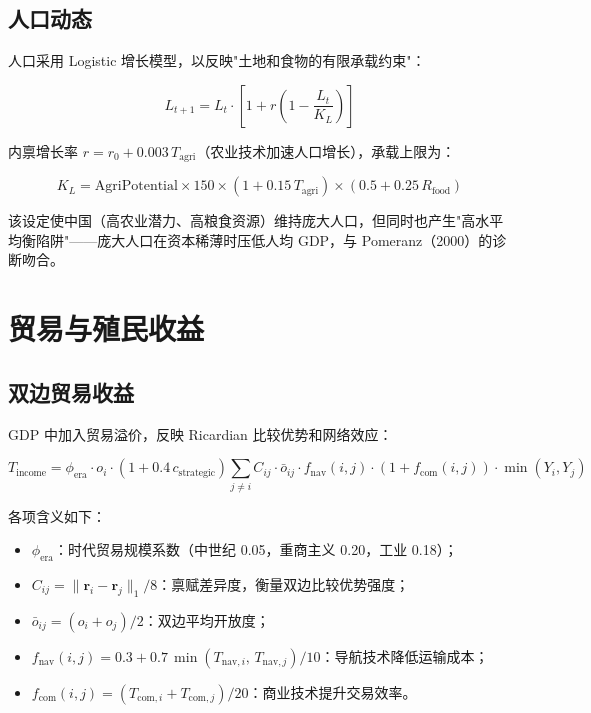 \documentclass[12pt, a4paper]{article}
\begin{document}
\subsection{人口动态}

人口采用 Logistic 增长模型，以反映"土地和食物的有限承载约束"：

\begin{equation}
L_{t+1} = L_t \cdot \left[1 + r\left(1 - \frac{L_t}{K_L}\right)\right]
\label{eq:population}
\end{equation}

内禀增长率 $r = r_0 + 0.003\,T_{\text{agri}}$（农业技术加速人口增长），承载上限为：

\begin{equation}
K_L = \text{AgriPotential} \times 150 \times \left(1 + 0.15\,T_{\text{agri}}\right) \times \left(0.5 + 0.25\,R_{\text{food}}\right)
\label{eq:carrying_capacity}
\end{equation}

该设定使中国（高农业潜力、高粮食资源）维持庞大人口，但同时也产生"高水平均衡陷阱"——庞大人口在资本稀薄时压低人均 GDP，与 Pomeranz（2000）的诊断吻合。

\section{贸易与殖民收益}

\subsection{双边贸易收益}

GDP 中加入贸易溢价，反映 Ricardian 比较优势和网络效应：

\begin{equation}
T_{\text{income}} = \phi_{\text{era}} \cdot o_i \cdot \left(1 + 0.4\,c_{\text{strategic}}\right) \sum_{j \neq i} C_{ij} \cdot \bar{o}_{ij} \cdot f_{\text{nav}}(i,j) \cdot (1 + f_{\text{com}}(i,j)) \cdot \min(Y_i, Y_j)
\label{eq:trade}
\end{equation}

各项含义如下：
\begin{itemize}
    \item $\phi_{\text{era}}$：时代贸易规模系数（中世纪 0.05，重商主义 0.20，工业 0.18）；
    \item $C_{ij} = \|\mathbf{r}_i - \mathbf{r}_j\|_1 / 8$：禀赋差异度，衡量双边比较优势强度；
    \item $\bar{o}_{ij} = (o_i + o_j)/2$：双边平均开放度；
    \item $f_{\text{nav}}(i,j) = 0.3 + 0.7\,\min(T_{\text{nav},i},\, T_{\text{nav},j})/10$：导航技术降低运输成本；
    \item $f_{\text{com}}(i,j) = (T_{\text{com},i} + T_{\text{com},j})/20$：商业技术提升交易效率。
\end{itemize}
\end{document}
